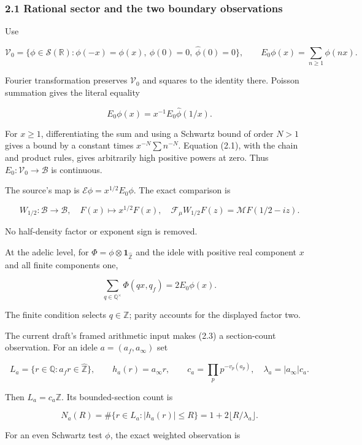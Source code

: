 \documentclass[
]{article}
\begin{document}
\subsubsection{2.1 Rational sector and the two boundary
observations}\label{rational-sector-and-the-two-boundary-observations}

Use

\[
\mathscr V_0=\{\phi\in\mathscr S(\mathbb R):\phi(-x)=\phi(x),\ \phi(0)=0,\ \widehat\phi(0)=0\},
\qquad E_0\phi(x)=\sum_{n\ge1}\phi(nx).
\]

Fourier transformation preserves \(\mathscr V_0\) and squares to the
identity there. Poisson summation gives the literal equality

\[
E_0\phi(x)=x^{-1}E_0\widehat\phi(1/x). \tag{2.1}
\]

For \(x\ge1\), differentiating the sum and using a Schwartz bound of
order \(N>1\) gives a bound by a constant times \(x^{-N}\sum n^{-N}\).
Equation (2.1), with the chain and product rules, gives arbitrarily high
positive powers at zero. Thus \(E_0:\mathscr V_0\to\mathscr B\) is
continuous.

The source's map is \(\mathcal E\phi=x^{1/2}E_0\phi\). The exact
comparison is

\[
W_{1/2}:\mathscr B\to\mathscr B,\quad F(x)\mapsto x^{1/2}F(x),
\quad
\mathcal F_\mu W_{1/2}F(z)=\mathcal MF(1/2-iz). \tag{2.2}
\]

No half-density factor or exponent sign is removed.

At the adelic level, for
\(\Phi=\phi\otimes\mathbf1_{\widehat{\mathbb Z}}\) and the idele with
positive real component \(x\) and all finite components one,

\[
\sum_{q\in\mathbb Q^\times}\Phi(qx,q_f)=2E_0\phi(x). \tag{2.3}
\]

The finite condition selects \(q\in\mathbb Z\); parity accounts for the
displayed factor two.

The current draft's framed arithmetic input makes (2.3) a section-count
observation. For an idele \(a=(a_f,a_\infty)\) set

\[
L_a=\{r\in\mathbb Q:a_fr\in\widehat{\mathbb Z}\},\qquad
h_a(r)=a_\infty r,\qquad
c_a=\prod_p p^{-v_p(a_p)},\quad \lambda_a=|a_\infty|c_a.
\]

Then \(L_a=c_a\mathbb Z\). Its bounded-section count is

\[
N_a(R)=\#\{r\in L_a:|h_a(r)|\le R\}=1+2\lfloor R/\lambda_a\rfloor.
\]

For an even Schwartz test \(\phi\), the exact weighted observation is
\end{document}
